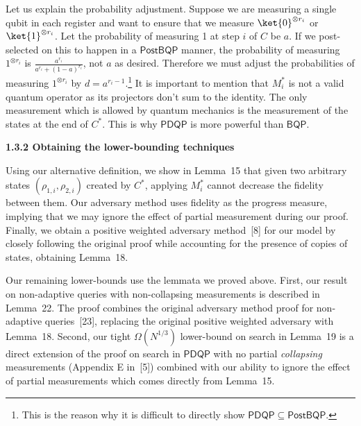 Let us explain the probability adjustment. Suppose we are measuring a single qubit in each register and want to ensure that we measure $\ket{0}^{\otimes r_{i}}$ or $\ket{1}^{\otimes r_{i}}$. Let the probability of measuring 1 at step $i$ of $C$ be $a$. If we post-selected on this to happen in a $\mathsf{PostBQP}$ manner, the probability of measuring $1^{\otimes r_{i}}$ is $\frac{a^{r_{i}}}{a^{r_{i}}+(1-a)^{r_{i}}}$, not $a$ as desired. Therefore we must adjust the probabilities of measuring $1^{\otimes r_{i}}$ by $d=a^{r_{i}-1}$.\footnote{This is the reason why it is difficult to directly show $\mathsf{PDQP}\subseteq\mathsf{PostBQP}$.} It is important to mention that $M^{*}_{i}$ is not a valid quantum operator as its projectors don’t sum to the identity. The only measurement which is allowed by quantum mechanics is the measurement of the states at the end of $C^{*}$. This is why $\mathsf{PDQP}$ is more powerful than $\mathsf{BQP}$.\par





\par\medskip\noindent\textbf{
1.3.2 Obtaining the lower-bounding techniques}\par




Using our alternative definition, we show in Lemma 15 that given two arbitrary states $(\rho_{1,i},\rho_{2,i})$ created by $C^{*}$, applying $M^{*}_{i}$ cannot decrease the fidelity between them. Our adversary method uses fidelity as the progress measure, implying that we may ignore the effect of partial measurement during our proof. Finally, we obtain a positive weighted adversary method [8] for our model by closely following the original proof while accounting for the presence of copies of states, obtaining Lemma 18.\par




Our remaining lower-bounds use the lemmata we proved above. First, our result on non-adaptive queries with non-collapsing measurements is described in Lemma 22. The proof combines the original adversary method proof for non-adaptive queries [23], replacing the original positive weighted adversary with Lemma 18. Second, our tight $\Omega(N^{1/3})$ lower-bound on search in Lemma 19 is a direct extension of the proof on search in $\mathsf{PDQP}$ with no partial \emph{collapsing} measurements (Appendix E in [5]) combined with our ability to ignore the effect of partial measurements which comes directly from Lemma 15.\par




